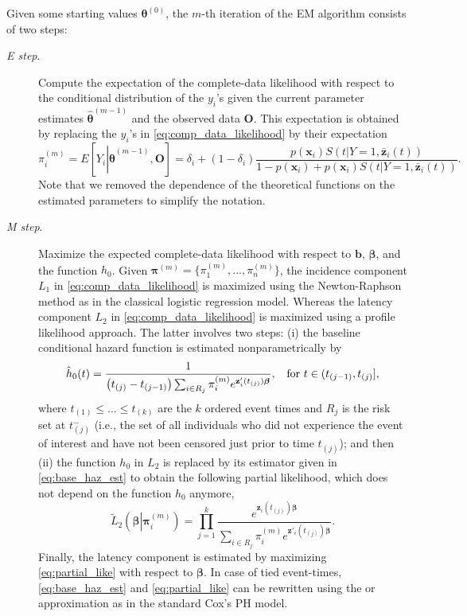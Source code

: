 Given some starting values $\boldsymbol{\theta}^{(0)}$, the $m$-th iteration of the EM algorithm consists of two steps:
\begin{description}
 \item [\textit{E step}.] Compute the expectation of the complete-data likelihood with respect to the conditional distribution of the $y_i$'s given the current parameter estimates $\hat{\boldsymbol{\theta}}^{(m-1)}$ and the observed data $\textbf{O}$.
 This expectation is obtained by replacing the $y_i$'s in \eqref{eq:comp_data_likelihood} by their expectation
$$\pi_{i}^{(m)}=E\left[Y_{i}\left|\hat{\boldsymbol{\theta}}^{(m-1)},\textbf{O}\right.\right]= \delta_i + (1-\delta_i) \frac{p(\textbf{x}_i)S(t|Y=1,\bar{\textbf{z}}_i(t))}{1-p(\textbf{x}_i)+p(\textbf{x}_i)S(t|Y=1,\bar{\textbf{z}}_i(t))}.$$
 Note that we removed the dependence of the theoretical functions on the estimated parameters to simplify the notation.
 \item [\textit{M step}.] Maximize the expected complete-data likelihood with respect to $\textbf{b}$, $\boldsymbol{\beta}$, and the function $h_0$. 
 Given $\boldsymbol{\pi}^{(m)}=\{\pi_{1}^{(m)},...,\pi_{n}^{(m)}\}$, the incidence component $L_{1}$ in \eqref{eq:comp_data_likelihood} is maximized 
 using the Newton-Raphson method as in the classical logistic regression model. Whereas the latency component $L_{2}$ in \eqref{eq:comp_data_likelihood} is maximized using a profile likelihood approach. The latter involves two steps: (i) the baseline conditional hazard function is estimated nonparametrically by
 \begin{equation}
 \label{eq:base_haz_est}
 \hat{h}_0(t) = \frac{1}{\left(t_{(j)}-t_{(j-1)}\right)\sum_{i\in R_{j}}\pi_{i}^{(m)}e^{\textbf{z}'_{i}(t_{(j)})\boldsymbol{\beta}}}, \hspace{0.2cm} \hbox{ for } t\in(t_{(j-1)},t_{(j)}],
 \end{equation}
 where $t_{(1)}\leq...\leq t_{(k)}$ are the $k$ ordered event times and $R_j$ is the risk set at $t_{(j)}^-$ (i.e., the set of all individuals who did not experience the event of interest and have not been censored just prior to time $t_{(j)}$);
 and then (ii) the function $h_0$ in $L_2$ is replaced by its estimator given in \eqref{eq:base_haz_est} to obtain the following partial likelihood, which does not depend on the function $h_0$ anymore,
 \begin{equation}
 \label{eq:partial_like}
 \tilde{L}_{2}\left(\boldsymbol{\beta}\left|\boldsymbol{\pi}_{i}^{(m)}\right.\right)= \prod_{j=1}^{k}\frac{e^{\textbf{z}_{i}(t_{(j)})\boldsymbol{\beta}}}{\sum_{i\in R_{j}}\pi_{i}^{(m)}e^{\textbf{z}'_{i}(t_{(j)})\boldsymbol{\beta}}}.
 \end{equation}
 Finally, the latency component is estimated by maximizing \eqref{eq:partial_like} with respect to $\boldsymbol{\beta}$.
 In case of tied event-times, \eqref{eq:base_haz_est} and \eqref{eq:partial_like} can be rewritten using the \citet{Breslow_1974} or \citet{Efron_1977} approximation as in the standard Cox's PH model.
\end{description}

